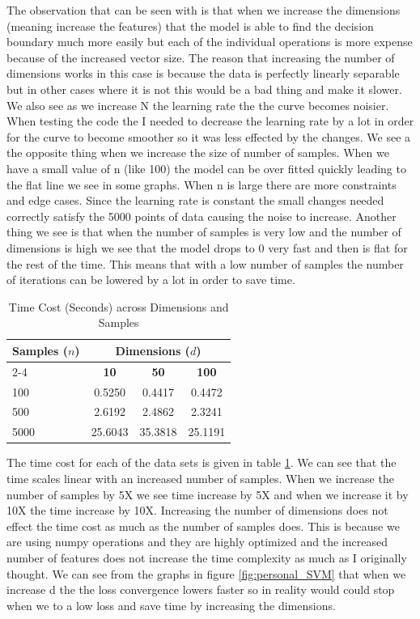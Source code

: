 \documentclass{article}
\begin{document}
The observation that can be seen with is that when we increase the dimensions (meaning increase the features) that the model is able to find the decision boundary much more easily but each of the individual operations is more expense because of the increased vector size. The reason that increasing the number of dimensions works in this case is because the data is perfectly linearly separable but in other cases where it is not this would be a bad thing and make it slower. We also see as we increase N the learning rate the the curve becomes noisier. When testing the code the I needed to decrease the learning rate by a lot in order for the curve to become smoother so it was less effected by the changes. We see a the opposite thing when we increase the size of number of samples. When we have a small value of n (like 100) the model can be over fitted quickly leading to the flat line we see in some graphs. When n is large there are more constraints and edge cases. Since the learning rate is constant the small changes needed correctly satisfy the 5000 points of data causing the noise to increase. Another thing we see is that when the number of samples is very low and the number of dimensions is high we see that the model drops to 0 very fast and then is flat for the rest of the time. This means that with a low number of samples the number of iterations can be lowered by a lot in order to save time. 

\begin{table}[h]
\centering
\caption{Time Cost (Seconds) across Dimensions and Samples}
\label{tab:time-cost}
\begin{tabular}{@{}lccc@{}}
\toprule
\textbf{Samples ($n$)} & \multicolumn{3}{c}{\textbf{Dimensions ($d$)}} \\ \cmidrule(l){2-4} 
 & \textbf{10} & \textbf{50} & \textbf{100} \\ \midrule
100 & 0.5250 & 0.4417 & 0.4472 \\
500 & 2.6192 & 2.4862 & 2.3241 \\
5000 & 25.6043 & 35.3818 & 25.1191 \\ \bottomrule
\end{tabular}
\end{table}

The time cost for each of the data sets is given in table \ref{tab:time-cost}. We can see that the time scales linear with an increased number of samples. When we increase the number of samples by 5X we see time increase by 5X and when we increase it by 10X the time increase by 10X. Increasing the number of dimensions does not effect the time cost as much as the number of samples does. This is because we are using numpy operations and they are highly optimized and the increased number of features does not increase the time complexity as much as I originally thought. We can see from the graphs in figure \ref{fig:personal_SVM} that when we increase d the the loss convergence lowers faster so in reality would could stop when we to a low loss and save time by increasing the dimensions.
\end{document}
